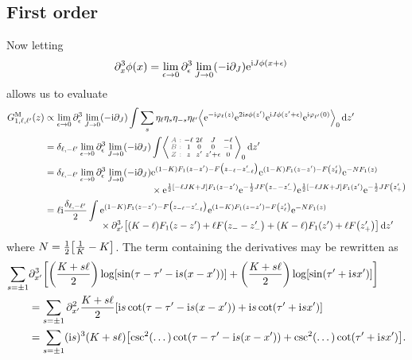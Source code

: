 \documentclass[english, parskip=full]{scrartcl}
\begin{document}
\subsection{First order}
Now letting
\begin{align}
\partial_x^3\phi(x) &= \lim_{\epsilon\rightarrow 0} \partial_\epsilon^3 \lim_{J\rightarrow 0} (-\text{i}\partial_J) \text{e}^{\text{i} J\phi(x+\epsilon)}
\end{align}
allows us to evaluate
\begin{align}
G_{1,\ell,\ell'}^\M(z) &\propto \lim_{\epsilon\rightarrow 0} \partial_\epsilon^3 \lim_{J\rightarrow 0} (-\i\partial_J) \int \sum_s \eta_\ell \eta_s \eta_{-s} \eta_{\ell'} \bra*{\powe{-\i\varphi_\ell(z)} \powe{2\i s\phi(z')} \powe{\i J\phi(z'+\epsilon)} \powe{\i\varphi_{\ell'}(0)}}_0\,\d z'\\
&= \delta_{\ell,-\ell'} \lim_{\epsilon\rightarrow 0} \partial_\epsilon^3 \lim_{J\rightarrow 0} (-\i\partial_J) \int \bra*{\zabx{-\ell & 2\ell & J & -\ell}{1 & 0 & 0 & -1}{z & z' & z'+\epsilon & 0}}_0\,\d z'\\
&= \delta_{\ell,-\ell'}  \lim_{\epsilon\rightarrow 0} \partial_\epsilon^3 \lim_{J\rightarrow 0} (-\i\partial_J) \bsplit{&\powe{(1-K) F_1(z-z') -F\kla[\big]{z_{-\ell} - z_{-\ell}'}} \powe{(1-K) F_1(z-z')-F\kla*{z_{\ell}'}} \powe{-NF_1(z)}\\
&\times \powe{\frac{1}{2}\klb*{-\ell JK + J}F_1(z-z')} \powe{-\frac{1}{2}J F\kla*{z_{-} - z_{-}'}} \powe{\frac{1}{2}\klb*{-\ell JK + J}F_1(z')} \powe{-\frac{1}{2}J F\kla*{z_{+}'}}}\\
&= \ell\i \frac{\delta_{\ell,-\ell'}}{2} \int \bsplit{&\powe{(1-K) F_1(z-z') -F\kla[\big]{z_{-\ell} - z_{-\ell}'}} \powe{(1-K) F_1(z-z')-F\kla*{z_{\ell}'}} \powe{-NF_1(z)}\\
&\times \partial_{x'}^3 \klb*{\kla*{ K-\ell}F_1(z-z')+\ell F\kla*{z_{-} - z_{-}'}+\kla*{ K -\ell}F_1(z')+\ell F\kla*{z_{+}'}}\,\d z'}
\end{align}
where $N=\frac{1}{2} \klb*{\frac{1}{K} - K}$.
The term containing the derivatives may be rewritten as
\begin{align}
\sum_{s=\pm 1} &\partial_{x'}^3 \klb*{ \kla*{\frac{K+s\ell}{2}} \log\klb*{\sin\kla*{\tau-\tau' - \i s(x-x')}} + \kla*{\frac{K+s\ell}{2}} \log\klb*{\sin\kla*{\tau' + \i s x'}}}\\
&=\sum_{s=\pm 1} \partial_{x'}^2 \frac{K+s\ell}{2} \klb*{ \i s \cot\kla*{\tau - \tau' - \i s(x-x')} + \i s \cot\kla*{\tau' + \i sx'}}\\
&= \sum_{s=\pm 1} (\i s)^3 \kla*{K+s\ell} \klb*{ \csc^2(\dots) \cot\kla*{\tau - \tau' - \i s(x-x')} + \csc^2(\dots) \cot\kla*{\tau' + \i sx'}}.
\end{align}
\end{document}
